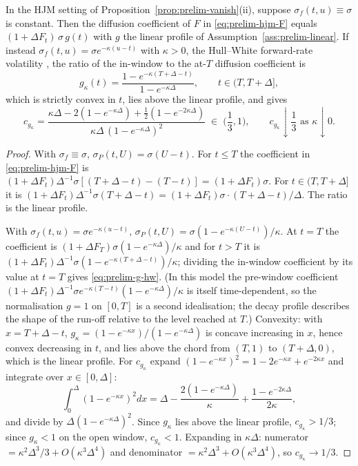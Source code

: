 \documentclass[../../../main.tex]{subfiles}
\begin{document}
\begin{proposition}\label{prop:prelim-flat}
In the HJM setting of Proposition~\ref{prop:prelim-vanish}(ii), suppose $\sigma_f(t,u)\equiv\sigma$ is constant. Then the diffusion coefficient of $F$ in \eqref{eq:prelim-hjm-F} equals $(1+\Delta F_t)\,\sigma\,g(t)$ with $g$ the linear profile of Assumption~\ref{ass:prelim-linear}. If instead $\sigma_f(t,u)=\sigma e^{-\kappa(u-t)}$ with $\kappa>0$, the Hull--White forward-rate volatility \cite[\S3.3]{brigo2006}, the ratio of the in-window to the at-$T$ diffusion coefficient is
\begin{equation}\label{eq:prelim-g-hw}
g_\kappa(t)=\frac{1-e^{-\kappa(T+\Delta-t)}}{1-e^{-\kappa\Delta}},\qquad t\in(T,T+\Delta],
\end{equation}
which is strictly convex in $t$, lies above the linear profile, and gives
\begin{equation}\label{eq:prelim-cg-hw}
c_{g_\kappa}=\frac{\kappa\Delta-2(1-e^{-\kappa\Delta})+\tfrac12(1-e^{-2\kappa\Delta})}{\kappa\Delta\,(1-e^{-\kappa\Delta})^2}\;\in\;\Big(\frac13,1\Big),\qquad c_{g_\kappa}\downarrow\frac13\text{ as }\kappa\downarrow0 .
\end{equation}
\end{proposition}

\begin{proof}
With $\sigma_f\equiv\sigma$, $\sigma_P(t,U)=\sigma(U-t)$. For $t\le T$ the coefficient in \eqref{eq:prelim-hjm-F} is $(1+\Delta F_t)\Delta^{-1}\sigma[(T+\Delta-t)-(T-t)]=(1+\Delta F_t)\sigma$. For $t\in(T,T+\Delta]$ it is $(1+\Delta F_t)\Delta^{-1}\sigma(T+\Delta-t)=(1+\Delta F_t)\sigma\cdot(T+\Delta-t)/\Delta$. The ratio is the linear profile.

With $\sigma_f(t,u)=\sigma e^{-\kappa(u-t)}$, $\sigma_P(t,U)=\sigma(1-e^{-\kappa(U-t)})/\kappa$. At $t=T$ the coefficient is $(1+\Delta F_T)\sigma(1-e^{-\kappa\Delta})/\kappa$ and for $t>T$ it is $(1+\Delta F_t)\Delta^{-1}\sigma(1-e^{-\kappa(T+\Delta-t)})/\kappa$; dividing the in-window coefficient by its value at $t=T$ gives \eqref{eq:prelim-g-hw}. (In this model the pre-window coefficient $(1+\Delta F_t)\Delta^{-1}\sigma e^{-\kappa(T-t)}(1-e^{-\kappa\Delta})/\kappa$ is itself time-dependent, so the normalisation $g=1$ on $[0,T]$ is a second idealisation; the decay profile describes the shape of the run-off relative to the level reached at $T$.) Convexity: with $x=T+\Delta-t$, $g_\kappa=(1-e^{-\kappa x})/(1-e^{-\kappa\Delta})$ is concave increasing in $x$, hence convex decreasing in $t$, and lies above the chord from $(T,1)$ to $(T+\Delta,0)$, which is the linear profile. For $c_{g_\kappa}$ expand $(1-e^{-\kappa x})^2=1-2e^{-\kappa x}+e^{-2\kappa x}$ and integrate over $x\in[0,\Delta]$:
\[
\int_0^\Delta(1-e^{-\kappa x})^2dx=\Delta-\frac{2(1-e^{-\kappa\Delta})}{\kappa}+\frac{1-e^{-2\kappa\Delta}}{2\kappa},
\]
and divide by $\Delta(1-e^{-\kappa\Delta})^2$. Since $g_\kappa$ lies above the linear profile, $c_{g_\kappa}>1/3$; since $g_\kappa<1$ on the open window, $c_{g_\kappa}<1$. Expanding in $\kappa\Delta$: numerator $=\kappa^2\Delta^3/3+O(\kappa^3\Delta^4)$ and denominator $=\kappa^2\Delta^3+O(\kappa^3\Delta^4)$, so $c_{g_\kappa}\to1/3$.
\end{proof}
\end{document}
